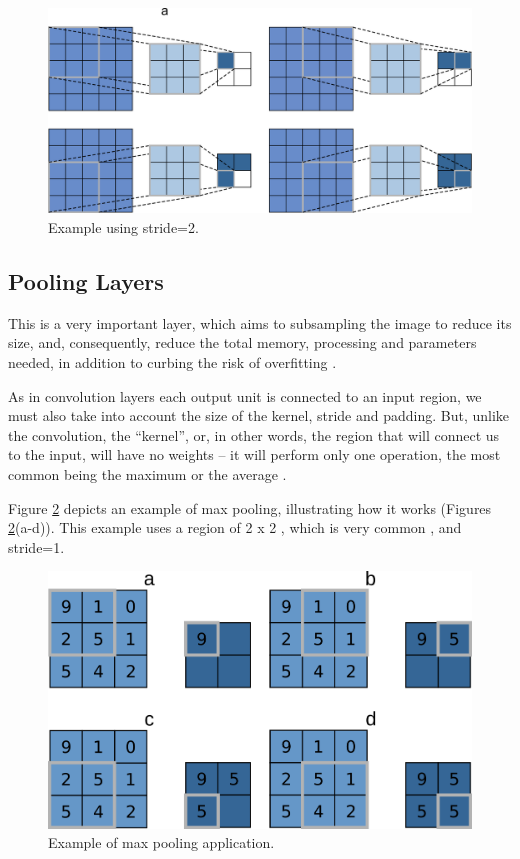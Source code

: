 \begin{figure}[h]
    \centering
    \includegraphics[scale=0.20]{"Part 3 - Learning Systems/Supervised Learning/Deep Learning/images/stride.png"}
    \caption{Example using stride=2.}
    \label{fig:stride}
\end{figure}


\subsection{Pooling Layers}

This is a very important layer, which aims to subsampling the image to reduce its size, and, consequently, reduce the total memory, processing and parameters needed, in addition to curbing the risk of overfitting \cite{geron2019,adrian2017,elgendy2020}.

As in convolution layers each output unit is connected to an input region, we must also take into account the size of the kernel, stride and padding. But, unlike the convolution, the ``kernel'', or, in other words, the region that will connect us to the input, will have no weights -- it will perform only one operation, the most common being the maximum or the average \cite{geron2019}.

Figure \ref{fig:figure121} depicts an example of max pooling, illustrating how it works (Figures \ref{fig:figure121}(a-d)). This example uses a region of 2 x 2 , which is very common \cite{adrian2017}, and stride=1.

\begin{figure}[h]
    \centering
    \includegraphics[scale=0.30]{"Part 3 - Learning Systems/Supervised Learning/Deep Learning/images/figure121.png"}
    \caption{Example of max pooling application.}
    \label{fig:figure121}
\end{figure}

